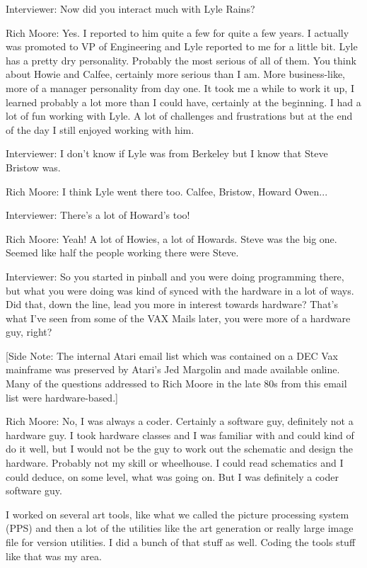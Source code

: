 \textcolor{interviewer}{Interviewer:} Now did you interact much with Lyle Rains?

\textcolor{interviewee}{Rich Moore:} Yes. I reported to him quite a few for quite a few years. I actually was promoted to VP of Engineering and Lyle reported to me for a little bit. Lyle has a pretty dry personality. Probably the most serious of all of them. You think about Howie and Calfee, certainly more serious than I am. More business-like, more of a manager personality from day one. It took me a while to work it up, I learned probably a lot more than I could have, certainly at the beginning. I had a lot of fun working with Lyle. A lot of challenges and frustrations but at the end of the day I still enjoyed working with him.

\textcolor{interviewer}{Interviewer:} I don't know if Lyle was from Berkeley but I know that Steve Bristow was.

\textcolor{interviewee}{Rich Moore:} I think Lyle went there too. Calfee, Bristow, Howard Owen...

\textcolor{interviewer}{Interviewer:} There's a lot of Howard's too!

\textcolor{interviewee}{Rich Moore:} Yeah! A lot of Howies, a lot of Howards. Steve was the big one. Seemed like half the people working there were Steve.

\textcolor{interviewer}{Interviewer:} So you started in pinball and you were doing programming there, but what you were doing was kind of synced with the hardware in a lot of ways. Did that, down the line, lead you more in interest towards hardware? That’s what I’ve seen from some of the VAX Mails later, you were more of a hardware guy, right?

[Side Note: The internal Atari email list which was contained on a DEC Vax mainframe was preserved by Atari’s Jed Margolin and made available online. Many of the questions addressed to Rich Moore in the late 80s from this email list were hardware-based.]

\textcolor{interviewee}{Rich Moore:} No, I was always a coder. Certainly a software guy, definitely not a hardware guy. I took hardware classes and I was familiar with and could kind of do it well, but I would not be the guy to work out the schematic and design the hardware. Probably not my skill or wheelhouse. I could read schematics and I could deduce, on some level, what was going on. But I was definitely a coder software guy. 

I worked on several art tools, like what we called the picture processing system (PPS) and then a lot of the utilities like the art generation or really large image file for version utilities. I did a bunch of that stuff as well. Coding the tools stuff like that was my area.

